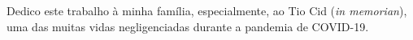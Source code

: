 \vfill
Dedico este trabalho à minha família, especialmente, ao Tio Cid (\textit{in memorian}), uma das muitas vidas negligenciadas durante a pandemia de COVID-19.  





